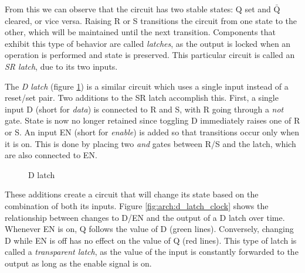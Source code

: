 From this we can observe that the circuit has two stable states: Q set and
$\bar{\text{Q}}$ cleared, or vice versa.  Raising R or S transitions the circuit
from one state to the other, which will be maintained until the next transition.
Components that exhibit this type of behavior are called \textit{latches}, as
the output is locked when an operation is performed and state is preserved.
This particular circuit is called an \textit{SR latch}, due to its two inputs.

The \textit{D latch} (figure \ref{fig:arch:d_latch}) is a similar circuit which
uses a single input instead of a reset/set pair.  Two additions to the SR latch
accomplish this.  First, a single input D (short for \textit{data}) is connected
to R and S, with R going through a \textit{not} gate.  State is now no longer
retained since toggling D immediately raises one of R or S.  An input EN (short
for \textit{enable}) is added so that transitions occur only when it is on.
This is done by placing two \textit{and} gates between R/S and the latch, which
are also connected to EN.

\begin{figure}[p]
    \centering
    
    \caption{D latch}
    \label{fig:arch:d_latch}
\end{figure}

These additions create a circuit that will change its state based on the
combination of both its inputs.  Figure \ref{fig:arch:d_latch_clock} shows the
relationship between changes to D/EN and the output of a D latch over time.
Whenever EN is on, Q follows the value of D (green lines).  Conversely, changing
D while EN is off has no effect on the value of Q (red lines).  This type of
latch is called a \textit{transparent latch}, as the value of the input is
constantly forwarded to the output as long as the enable signal is on.

